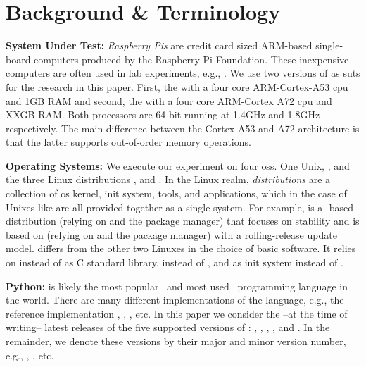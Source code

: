 \section{Background \& Terminology}\label{sec:background}

\noindent\textbf{System Under Test:} \emph{Raspberry Pis} are credit card sized ARM-based single-board computers produced by the Raspberry Pi Foundation\cite{raspberry_pi_website}.
These inexpensive computers are often used in lab experiments, e.g., \cite{zhao2015exploring,pfeiffer2024energy}.
We use two versions of  as \glspl{sut} for the research in this paper.
First, the  with a four core ARM-Cortex-A53 \gls{cpu} and 1GB RAM and second, the  with a four core ARM-Cortex A72 \gls{cpu} and XXGB RAM.
Both processors are 64-bit running at 1.4GHz and 1.8GHz respectively.
The main difference between the Cortex-A53 and A72 architecture is that the latter supports out-of-order memory operations.

\noindent\textbf{Operating Systems:} We execute our experiment on four \glspl{os}.
One Unix, \cite{freebsd_website}, and the three Linux distributions \cite{alpine_website}, \cite{manjaro_website} and \cite{ubuntu_website}.
In the Linux realm, \emph{distributions} are a collection of \gls{os} kernel, init system, tools, and applications, which in the case of Unixes like  are all provided together as a single system.
For example,  is a -based distribution (relying on  and the  package manager) that focuses on stability and  is based on  (relying on  and the  package manager) with a rolling-release update model.
 differs from the other two Linuxes in the choice of basic software.
It relies on  instead of  as C standard library,  instead of , and  as init system instead of .

\noindent\textbf{Python:} is likely the most popular~\cite{djurdjev2024popularity,pypl,tiobe} and most used~\cite{stackover, statista} programming language in the world.
There are many different implementations of the language, e.g., the reference implementation \cp, , , etc.
In this paper we consider the --at the time of writing-- latest releases of the five supported versions of \cp: , , , , and .
In the remainder, we denote these versions by their major and minor version number, e.g., , , etc.

